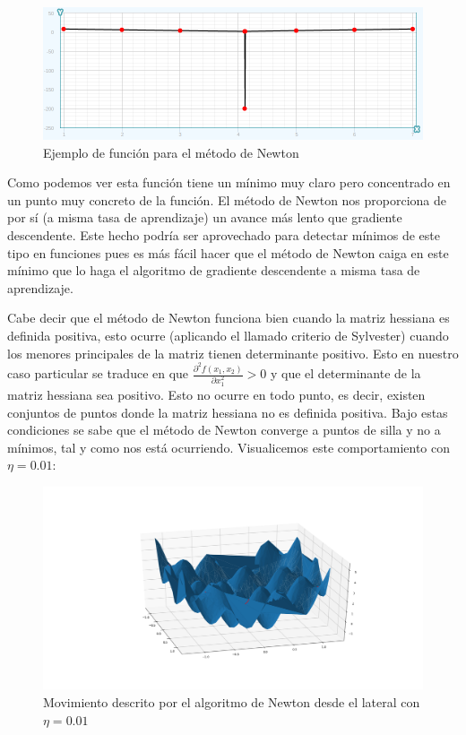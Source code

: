 \documentclass[12pt,a4paper]{article}
\begin{document}
\begin{figure}[H]
	\centering
	\includegraphics[scale=0.5]{./Imagenes/bonus5.png}
	\caption{Ejemplo de función para el método de Newton}
	\label{bonus5}
\end{figure}

Como podemos ver esta función tiene un mínimo muy claro pero concentrado en un punto muy concreto de la función. El método de Newton nos proporciona de por sí (a misma tasa de aprendizaje) un avance más lento que gradiente descendente. Este hecho podría ser aprovechado para detectar mínimos de este tipo en funciones pues es más fácil hacer que el método de Newton caiga en este mínimo que lo haga el algoritmo de gradiente descendente a misma tasa de aprendizaje.

Cabe decir que el método de Newton funciona bien cuando la matriz hessiana es definida positiva, esto ocurre (aplicando el llamado criterio de Sylvester) cuando los menores principales de la matriz tienen determinante positivo. Esto en nuestro caso particular se traduce en que $\frac{\partial^2 f(x_1,x_2)}{\partial x_{1}^{2}}>0$ y que el determinante de la matriz hessiana sea positivo. Esto no ocurre en todo punto, es decir, existen conjuntos de puntos donde la matriz hessiana no es definida positiva. Bajo estas condiciones se sabe que el método de Newton converge a puntos de silla y no a mínimos, tal y como nos está ocurriendo. Visualicemos este comportamiento con $\eta=0.01$:

\begin{figure}[H]
	\centering
	\includegraphics[scale=0.4]{./Imagenes/bonus6.png}
	\caption{Movimiento descrito por el algoritmo de Newton desde el lateral con $\eta=0.01$}
\end{figure}
\end{document}
